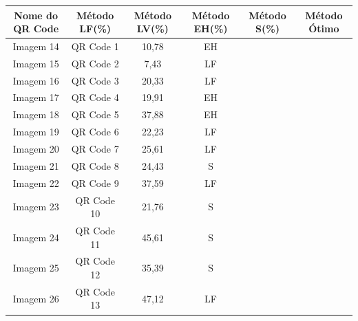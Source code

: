\documentclass{ceel}
\begin{document}
\begin{multicols}{2}
\vspace{0.5cm}
\begin{minipage}[h]{\columnwidth}
\begin{scriptsize}
\def\arraystretch{1.35}
\captionsetup{type=table}
\begin{center}
\caption{Erro, em porcentagem, referente a cada método e método ótimo aplicado sobre as imagens de QR Code submetidas ao padrão de Iluminação 2.} \label{tabP2} \vspace{-0.2cm}
\begin{tabular}{c c c c c c}\hline
\textbf{Nome do QR Code}&\textbf{Método LF(\%)}&\textbf{Método LV(\%)}&\textbf{Método EH(\%)}&\textbf{Método S(\%)}&\textbf{Método Ótimo} \\\hline
Imagem 14 & QR Code 1 & 10,78 & EH \\
Imagem 15 & QR Code 2 & 7,43 & LF \\
Imagem 16 & QR Code 3 & 20,33 & LF \\
Imagem 17 & QR Code 4 & 19,91 & EH \\
Imagem 18 & QR Code 5 & 37,88 & EH\\
Imagem 19 & QR Code 6 & 22,23 & LF\\
Imagem 20 & QR Code 7 & 25,61 & LF\\
Imagem 21 & QR Code 8 & 24,43 & S \\
Imagem 22 & QR Code 9 & 37,59 & LF \\
Imagem 23 & QR Code 10 & 21,76 & S \\
Imagem 24 & QR Code 11 & 45,61 & S \\
Imagem 25 & QR Code 12 & 35,39 & S \\
Imagem 26 & QR Code 13 & 47,12 & LF\\\hline
\end{tabular}
\end{center}
\end{scriptsize}
\end{minipage}


\end{multicols}
\end{document}
